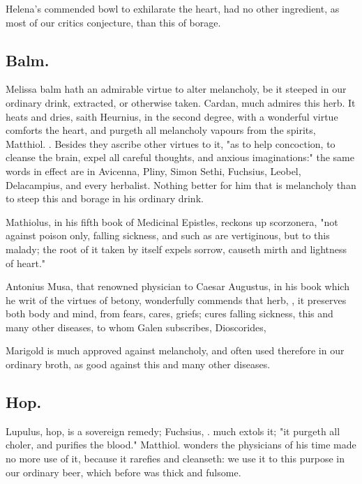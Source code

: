 {Helena's commended bowl to exhilarate the heart, had no other ingredient, as most of our critics conjecture, than this of borage.

\subsection{Balm.}
Melissa balm hath an admirable virtue to alter melancholy, be it steeped in our ordinary drink, extracted, or otherwise taken. Cardan,  much admires this herb. It heats and dries, saith Heurnius, in the second degree, with a wonderful virtue comforts the heart, and purgeth all melancholy vapours from the spirits, Matthiol. . Besides they ascribe other virtues to it, "as to help concoction, to cleanse the brain, expel all careful thoughts, and anxious imaginations:" the same words in effect are in Avicenna, Pliny, Simon Sethi, Fuchsius, Leobel, Delacampius, and every herbalist. Nothing better for him that is melancholy than to steep this and borage in his ordinary drink.

Mathiolus, in his fifth book of Medicinal Epistles, reckons up scorzonera, "not against poison only, falling sickness, and such as are vertiginous, but to this malady; the root of it taken by itself expels sorrow, causeth mirth and lightness of heart."

Antonius Musa, that renowned physician to Caesar Augustus, in his book which he writ of the virtues of betony,  wonderfully commends that herb, , it preserves both body and mind, from fears, cares, griefs; cures falling sickness, this and many other diseases, to whom Galen subscribes,  Dioscorides, 

Marigold is much approved against melancholy, and often used therefore in our ordinary broth, as good against this and many other diseases.

\subsection{Hop.}
Lupulus, hop, is a sovereign remedy; Fuchsius, . much extols it; "it purgeth all choler, and purifies the blood." Matthiol.  wonders the physicians of his time made no more use of it, because it rarefies and cleanseth: we use it to this purpose in our ordinary beer, which before was thick and fulsome.

}
